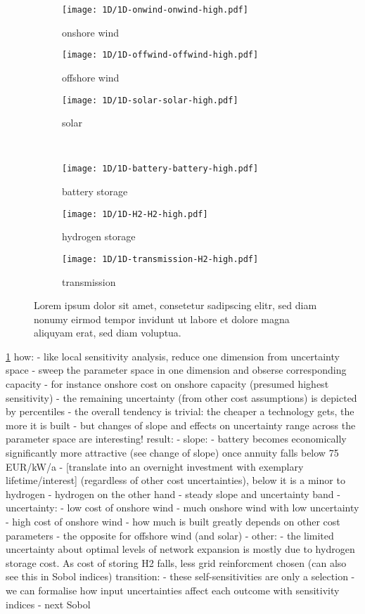 \begin{figure}
    \begin{subfigure}[t]{0.32\textwidth}
        \caption{onshore wind}
        \texttt{[image: 1D/1D-onwind-onwind-high.pdf]}
    \end{subfigure}
    \begin{subfigure}[t]{0.32\textwidth}
        \caption{offshore wind}
        \texttt{[image: 1D/1D-offwind-offwind-high.pdf]}
    \end{subfigure}
    \begin{subfigure}[t]{0.32\textwidth}
        \caption{solar}
        \texttt{[image: 1D/1D-solar-solar-high.pdf]}
    \end{subfigure} \\
    \begin{subfigure}[t]{0.32\textwidth}
        \caption{battery storage}
        \texttt{[image: 1D/1D-battery-battery-high.pdf]}
    \end{subfigure}
    \begin{subfigure}[t]{0.32\textwidth}
        \caption{hydrogen storage}
        \texttt{[image: 1D/1D-H2-H2-high.pdf]}
    \end{subfigure}
    \begin{subfigure}[t]{0.32\textwidth}
        \caption{transmission}
        \texttt{[image: 1D/1D-transmission-H2-high.pdf]}
    \end{subfigure}
    \caption{Lorem ipsum dolor sit amet, consetetur sadipscing elitr, sed diam nonumy eirmod tempor invidunt ut labore et dolore magna aliquyam erat, sed diam voluptua.}
    \label{fig:sensitivity}
\end{figure}

\cref{fig:sensitivity}
how:
- like local sensitivity analysis, reduce one dimension from uncertainty space
- sweep the parameter space in one dimension and obserse corresponding capacity
- for instance onshore cost on onshore capacity (presumed highest sensitivity)
- the remaining uncertainty (from other cost assumptions) is depicted by percentiles
- the overall tendency is trivial: the cheaper a technology gets, the more it is built
- but changes of slope and effects on uncertainty range across the parameter space are interesting!
result:
- slope:
  - battery  becomes economically significantly more attractive (see change of slope) once annuity falls below 75 EUR/kW/a
  - [translate into an overnight investment with exemplary lifetime/interest] (regardless of other cost uncertainties), below it is a minor to hydrogen
  - hydrogen on the other hand - steady slope and uncertainty band
- uncertainty:
  - low cost of onshore wind - much onshore wind with low uncertainty
  - high cost of onshore wind - how much is built greatly depends on other cost parameters
  - the opposite for offshore wind (and solar)
- other:
  - the limited uncertainty about optimal levels of network expansion is mostly due to hydrogen storage cost. As cost of storing H2 falls, less grid reinforcment chosen (can also see this  in Sobol indices)
transition:
- these self-sensitivities are only a selection
- we can formalise how input uncertainties affect each outcome with sensitivity indices
- next Sobol

